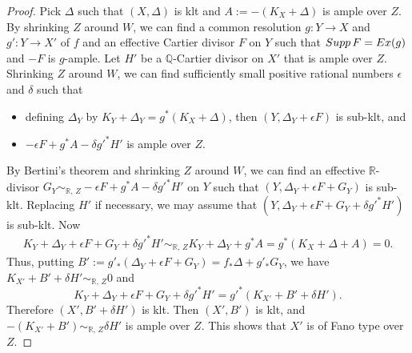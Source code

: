 \documentclass[10pt,a4paper]{amsart}
\begin{document}
\begin{proof}
Pick $\Delta$ such that $(X,\Delta)$ is klt and $A:=-(K_{X}+\Delta)$ is ample over $Z$. 
By shrinking $Z$ around $W$, we can find a common resolution $g \colon Y \to X$ and $g' \colon Y \to X'$ of $f$ and an effective Cartier divisor $F$ on $Y$ such that ${\rm Supp}\,F={\rm Ex}(g)$ and $-F$ is $g$-ample. 
Let $H'$ be a $\mathbb{Q}$-Cartier divisor on $X'$ that is ample over $Z$. 
Shrinking $Z$ around $W$, we can find sufficiently small positive rational numbers $\epsilon$ and $\delta$ such that 
\begin{itemize}
\item
defining $\Delta_{Y}$ by $K_{Y}+\Delta_{Y}=g^{*}(K_{X}+\Delta)$, then $(Y,\Delta_{Y}+\epsilon F)$ is sub-klt, and 
\item
$-\epsilon F + g^{*}A-\delta g'^{*}H'$ is ample over $Z$. 
\end{itemize}
By Bertini's theorem and shrinking $Z$ around $W$, we can find an effective $\mathbb{R}$-divisor $G_{Y} \sim_{\mathbb{R},\,Z}-\epsilon F + g^{*}A-\delta g'^{*}H'$ on $Y$ such that $(Y,\Delta_{Y}+\epsilon F+G_{Y})$ is sub-klt. 
Replacing $H'$ if necessary, we may assume that $(Y,\Delta_{Y}+\epsilon F+G_{Y}+\delta g'^{*}H')$ is sub-klt. 
Now
\begin{equation*}
\begin{split}
K_{Y}+\Delta_{Y}+\epsilon F+G_{Y}+\delta g'^{*}H'\sim_{\mathbb{R},\,Z}K_{Y}+\Delta_{Y}+g^{*}A=g^{*}(K_{X}+\Delta+A) = 0.
\end{split}
\end{equation*}
Thus, putting $B':=g'_{*}(\Delta_{Y}+\epsilon F+G_{Y})=f_{*}\Delta+g'_{*}G_{Y}$, we have $K_{X'}+B'+\delta H' \sim_{\mathbb{R},\,Z}0$ and 
$$K_{Y}+\Delta_{Y}+\epsilon F+G_{Y}+\delta g'^{*}H'=g'^{*}(K_{X'}+B'+\delta H').$$ 
Therefore $(X',B'+\delta H')$ is klt. 
Then $(X',B')$ is klt, and $-(K_{X'}+B') \sim_{\mathbb{R},\,Z}\delta H'$ is ample over $Z$. 
This shows that $X'$ is of Fano type over $Z$. 
\end{proof}
\end{document}
